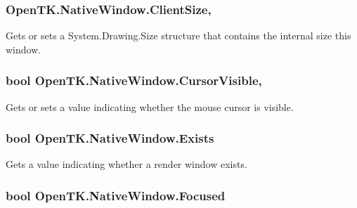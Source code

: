 \hypertarget{class_open_t_k_1_1_native_window_ac863b486a8c7e3d5d6b09aae1c010eac}{
\subsubsection[{Client\-Size}]{ Open\-T\-K.\-Native\-Window.\-Client\-Size\hspace{0.3cm}{\ttfamily [get]}, {\ttfamily [set]}}}\label{class_open_t_k_1_1_native_window_ac863b486a8c7e3d5d6b09aae1c010eac}


Gets or sets a System.\-Drawing.\-Size structure that contains the internal size this window. 

\hypertarget{class_open_t_k_1_1_native_window_a028d01996236ac800257e79392f42c3c}{
\subsubsection[{Cursor\-Visible}]{\setlength{\rightskip}{0pt plus 5cm}bool Open\-T\-K.\-Native\-Window.\-Cursor\-Visible\hspace{0.3cm}{\ttfamily [get]}, {\ttfamily [set]}}}\label{class_open_t_k_1_1_native_window_a028d01996236ac800257e79392f42c3c}


Gets or sets a value indicating whether the mouse cursor is visible. 

\hypertarget{class_open_t_k_1_1_native_window_a150f5a96451228bfc91fe9587eb64c19}{
\subsubsection[{Exists}]{\setlength{\rightskip}{0pt plus 5cm}bool Open\-T\-K.\-Native\-Window.\-Exists\hspace{0.3cm}{\ttfamily [get]}}}\label{class_open_t_k_1_1_native_window_a150f5a96451228bfc91fe9587eb64c19}


Gets a value indicating whether a render window exists. 

\hypertarget{class_open_t_k_1_1_native_window_ad68c0c086e7733e7a55745425c4faf5d}{
\subsubsection[{Focused}]{\setlength{\rightskip}{0pt plus 5cm}bool Open\-T\-K.\-Native\-Window.\-Focused\hspace{0.3cm}{\ttfamily [get]}}}\label{class_open_t_k_1_1_native_window_ad68c0c086e7733e7a55745425c4faf5d}


